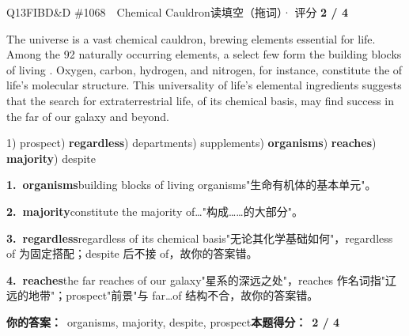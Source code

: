 \begin{qblock}{Q13\quad FIBD\&D \#1068\ \ Chemical Cauldron}{读填空（拖词）· 评分 \textcolor{cAccent}{\bfseries 2 / 4}}
\begin{promptbox}
The universe is a vast chemical cauldron, brewing elements essential for life. Among the 92 naturally occurring elements, a select few form the building blocks of living . Oxygen, carbon, hydrogen, and nitrogen, for instance, constitute the  of life's molecular structure. This universality of life's elemental ingredients suggests that the search for extraterrestrial life,  of its chemical basis, may find success in the far  of our galaxy and beyond.
\end{promptbox}
{\small 1) prospect) \textbf{regardless}) departments) supplements) \textbf{organisms}) \textbf{reaches}) \textbf{majority}) despite}
\begin{notebox}\footnotesize
\textbf{1.\ organisms}\quad building blocks of living organisms"生命有机体的基本单元"。\par\smallskip
\textbf{2.\ majority}\quad constitute the majority of\dots"构成……的大部分"。\par\smallskip
\textbf{3.\ regardless}\quad regardless of its chemical basis"无论其化学基础如何"，regardless of 为固定搭配；despite 后不接 of，故你的答案错。\par\smallskip
\textbf{4.\ reaches}\quad the far reaches of our galaxy"星系的深远之处"，reaches 作名词指"辽远的地带"；prospect"前景"与 far\dots of 结构不合，故你的答案错。
\end{notebox}
\smallskip
\textbf{你的答案：}\ organisms, majority, {\color{cWrong}despite, prospect}\qquad\textbf{本题得分：}\ {\color{cAccent}\bfseries 2 / 4}
\end{qblock}

